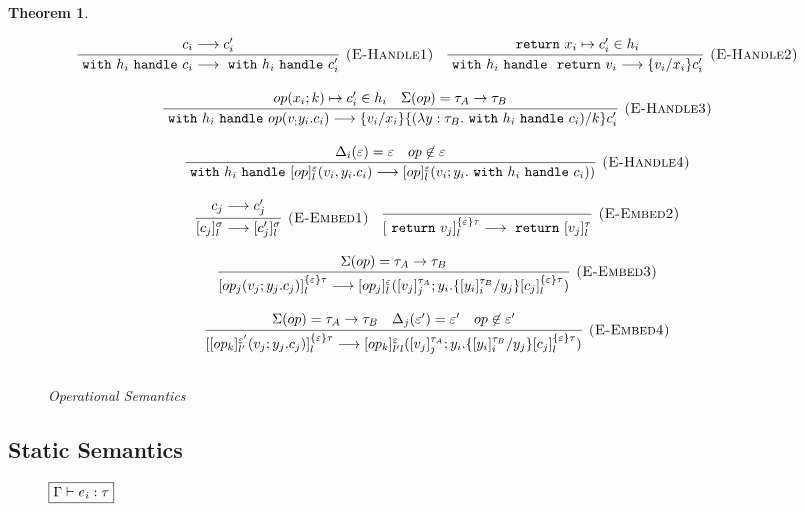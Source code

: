 \documentclass{article}
\newtheorem{theorem}{Theorem}[section]
\newcommand{\m}[1]{\ \texttt{#1}\ }
\begin{document}
\begin{theorem}
\begin{figure}[H]
{\[\begin{array}{c}
  
 \infer[\textsc{(E-Handle1)}]
  {\m{with} h_i \m{handle} c_i \longrightarrow \m{with} h_i \m{handle} c_i' }
  {c_i \longrightarrow c_i'} \quad
  
\infer[\textsc{(E-Handle2)}]
  {\m{with} h_i \m{handle} \m{return} v_i \longrightarrow \{v_i/x_i\}c_i' }
  {\m{return} x_i \mapsto	c_i' \in h_i} \\[3ex]
  
\infer[\textsc{(E-Handle3)}]
  {\m{with} h_i \m{handle} op(v_; y_i.c_i) \longrightarrow \{v_i/x_i\} \{(\lambda y: \tau_B.
   \m{with} h_i\m{handle} c_i) / k\}c_i' }
  {op(x_i; k) \mapsto c_i' \in h_i & \Sigma(op) = \tau_A \rightarrow \tau_B} \\[3ex]
  
\infer[\textsc{(E-Handle4)}]
  {\m{with} h_i \m{handle} [op]^\varepsilon_l(v_i, y_i.c_i) \longrightarrow [op]^\varepsilon_l(v_i; y_i. \m{with} h_i \m{handle} c_i))}
  {\Delta_i(\varepsilon) = \varepsilon & op \not \in \varepsilon} \\[3ex]
  
\infer[\textsc{(E-Embed1)}]
{[c_j]^\sigma_l \longrightarrow [c_j']^\sigma_l}
{c_j \longrightarrow c_j'} \quad 



\infer[\textsc{(E-Embed2)}]
{[\m{return} v_j]^{\{\varepsilon\}\tau}_l \longrightarrow \m{return} [v_j]^\tau_l}
{} \\[3ex]

\infer[\textsc{(E-Embed3)}]
{[op_j(v_j; y_j.c_j)]^{\{\varepsilon\}\tau}_l \longrightarrow [op_j]^\varepsilon_l([v_j]^{\tau_A}_j; y_i. \{[y_i]^{\tau_B}_i / y_j\}[c_j]^{\{\varepsilon\}\tau}_l)}
{ \Sigma(op) = \tau_A \rightarrow \tau_B} \\[3ex]

\infer[\textsc{(E-Embed4)}]
{[[op_k]^{\varepsilon'}_{l'}(v_j; y_j.c_j)]^{\{\varepsilon\}\tau}_l \longrightarrow [op_k]^\varepsilon_{l'l}([v_j]^{\tau_A}_j; y_i. \{[y_i]^{\tau_B}_i / y_j\}[c_j]^{\{\varepsilon\}\tau}_l)}
{ \Sigma(op) = \tau_A \rightarrow \tau_B& \Delta_j(\varepsilon') = \varepsilon' & op \not \in \varepsilon'} \\[3ex]



\end{array}
\]

}
\caption{Operational Semantics}
\end{figure}

\subsection{Static Semantics}
\begin{figure}[H]
\footnotesize{
\noindent$\fbox{$\Gamma \vdash e_i : \tau$}$
\[
\begin{array}{c}


\end{array}\]}
\end{figure}
\end{theorem}
\end{document}
